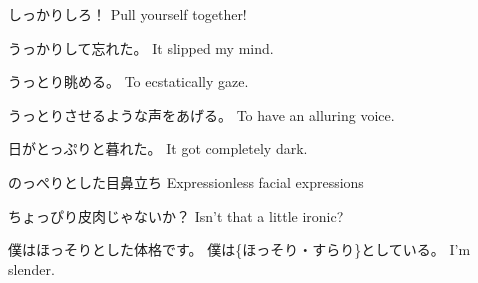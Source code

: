 \par{しっかりしろ！ \hfill\break
Pull yourself together! }

\par{うっかりして忘れた。 \hfill\break
It slipped my mind. }

\par{うっとり眺める。 \hfill\break
To ecstatically gaze. }

\par{うっとりさせるような声をあげる。 \hfill\break
To have an alluring voice. }

\par{日がとっぷりと暮れた。 \hfill\break
It got completely dark. }

\par{のっぺりとした目鼻立ち \hfill\break
Expressionless facial expressions }

\par{ちょっぴり皮肉じゃないか？ \hfill\break
Isn't that a little ironic? }

\par{僕はほっそりとした体格です。 \hfill\break
僕は\{ほっそり・すらり\}としている。 \hfill\break
I'm slender. }
    